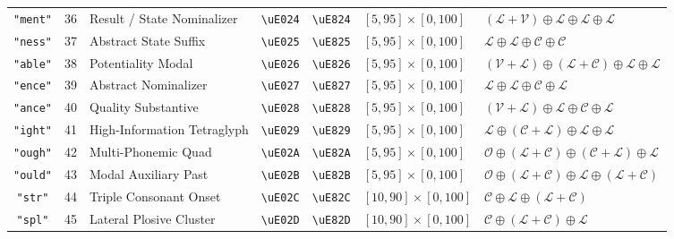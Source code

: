 \documentclass[11pt,oneside,letterpaper]{article}
\theoremstyle{definition}
\begin{document}
\begin{table}[b]
\begin{tabularx}{\textwidth}{cc>{\raggedright\arraybackslash}Xcc>{\raggedright\arraybackslash}p{3.2cm}>{\raggedright\arraybackslash}X}
\texttt{"ment"} & 36 & Result / State Nominalizer & \texttt{\textbackslash uE024} & \texttt{\textbackslash uE824} & $[5, 95] \times [0, 100]$  & $(\mathcal{L}+\mathcal{V}) \oplus \mathcal{L} \oplus \mathcal{L} \oplus \mathcal{L}$ \\
\texttt{"ness"} & 37 & Abstract State Suffix      & \texttt{\textbackslash uE025} & \texttt{\textbackslash uE825} & $[5, 95] \times [0, 100]$  & $\mathcal{L} \oplus \mathcal{L} \oplus \mathcal{C} \oplus \mathcal{C}$ \\
\texttt{"able"} & 38 & Potentiality Modal         & \texttt{\textbackslash uE026} & \texttt{\textbackslash uE826} & $[5, 95] \times [0, 100]$  & $(\mathcal{V}+\mathcal{L}) \oplus (\mathcal{L}+\mathcal{C}) \oplus \mathcal{L} \oplus \mathcal{L}$ \\
\texttt{"ence"} & 39 & Abstract Nominalizer       & \texttt{\textbackslash uE027} & \texttt{\textbackslash uE827} & $[5, 95] \times [0, 100]$  & $\mathcal{L} \oplus \mathcal{L} \oplus \mathcal{C} \oplus \mathcal{L}$ \\
\texttt{"ance"} & 40 & Quality Substantive        & \texttt{\textbackslash uE028} & \texttt{\textbackslash uE828} & $[5, 95] \times [0, 100]$  & $(\mathcal{V}+\mathcal{L}) \oplus \mathcal{L} \oplus \mathcal{C} \oplus \mathcal{L}$ \\
\texttt{"ight"} & 41 & High-Information Tetraglyph& \texttt{\textbackslash uE029} & \texttt{\textbackslash uE829} & $[5, 95] \times [0, 100]$  & $\mathcal{L} \oplus (\mathcal{C}+\mathcal{L}) \oplus \mathcal{L} \oplus \mathcal{L}$ \\
\texttt{"ough"} & 42 & Multi-Phonemic Quad        & \texttt{\textbackslash uE02A} & \texttt{\textbackslash uE82A} & $[5, 95] \times [0, 100]$  & $\mathcal{O} \oplus (\mathcal{L}+\mathcal{C}) \oplus (\mathcal{C}+\mathcal{L}) \oplus \mathcal{L}$ \\
\texttt{"ould"} & 43 & Modal Auxiliary Past       & \texttt{\textbackslash uE02B} & \texttt{\textbackslash uE82B} & $[5, 95] \times [0, 100]$  & $\mathcal{O} \oplus (\mathcal{L}+\mathcal{C}) \oplus \mathcal{L} \oplus (\mathcal{L}+\mathcal{C})$ \\
\texttt{"str"}  & 44 & Triple Consonant Onset     & \texttt{\textbackslash uE02C} & \texttt{\textbackslash uE82C} & $[10, 90] \times [0, 100]$ & $\mathcal{C} \oplus \mathcal{L} \oplus (\mathcal{L}+\mathcal{C})$ \\
\texttt{"spl"}  & 45 & Lateral Plosive Cluster    & \texttt{\textbackslash uE02D} & \texttt{\textbackslash uE82D} & $[10, 90] \times [0, 100]$ & $\mathcal{C} \oplus (\mathcal{L}+\mathcal{C}) \oplus \mathcal{L}$ \\

\end{tabularx}
\end{table}
\end{document}
